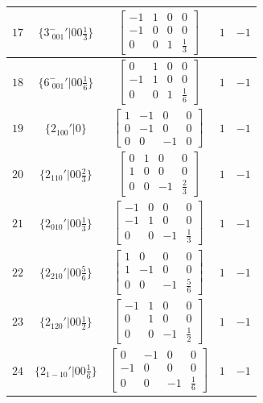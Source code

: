 \documentclass[fleqn,8pt]{jsarticle}
\begin{document}
\begin{longtable}{ccccc}
$ 17 $ & $ \{3^{-}_{\,\,001}{}'|0 0 \frac{1}{3}\} $ & $ \begin{bmatrix} -1 & 1 & 0 & 0 \\ -1 & 0 & 0 & 0 \\ 0 & 0 & 1 & \frac{1}{3} \end{bmatrix} $ & $ 1 $ & $ -1 $ \\ \hline
$ 18 $ & $ \{6^{-}_{\,\,001}{}'|0 0 \frac{1}{6}\} $ & $ \begin{bmatrix} 0 & 1 & 0 & 0 \\ -1 & 1 & 0 & 0 \\ 0 & 0 & 1 & \frac{1}{6} \end{bmatrix} $ & $ 1 $ & $ -1 $ \\ \hline
$ 19 $ & $ \{2{}_{100}{}'|0\} $ & $ \begin{bmatrix} 1 & -1 & 0 & 0 \\ 0 & -1 & 0 & 0 \\ 0 & 0 & -1 & 0 \end{bmatrix} $ & $ 1 $ & $ -1 $ \\ \hline
$ 20 $ & $ \{2{}_{110}{}'|0 0 \frac{2}{3}\} $ & $ \begin{bmatrix} 0 & 1 & 0 & 0 \\ 1 & 0 & 0 & 0 \\ 0 & 0 & -1 & \frac{2}{3} \end{bmatrix} $ & $ 1 $ & $ -1 $ \\ \hline
$ 21 $ & $ \{2{}_{010}{}'|0 0 \frac{1}{3}\} $ & $ \begin{bmatrix} -1 & 0 & 0 & 0 \\ -1 & 1 & 0 & 0 \\ 0 & 0 & -1 & \frac{1}{3} \end{bmatrix} $ & $ 1 $ & $ -1 $ \\ \hline
$ 22 $ & $ \{2{}_{210}{}'|0 0 \frac{5}{6}\} $ & $ \begin{bmatrix} 1 & 0 & 0 & 0 \\ 1 & -1 & 0 & 0 \\ 0 & 0 & -1 & \frac{5}{6} \end{bmatrix} $ & $ 1 $ & $ -1 $ \\ \hline
$ 23 $ & $ \{2{}_{120}{}'|0 0 \frac{1}{2}\} $ & $ \begin{bmatrix} -1 & 1 & 0 & 0 \\ 0 & 1 & 0 & 0 \\ 0 & 0 & -1 & \frac{1}{2} \end{bmatrix} $ & $ 1 $ & $ -1 $ \\ \hline
$ 24 $ & $ \{2{}_{1-10}{}'|0 0 \frac{1}{6}\} $ & $ \begin{bmatrix} 0 & -1 & 0 & 0 \\ -1 & 0 & 0 & 0 \\ 0 & 0 & -1 & \frac{1}{6} \end{bmatrix} $ & $ 1 $ & $ -1 $ \\
\end{longtable}
\end{document}

